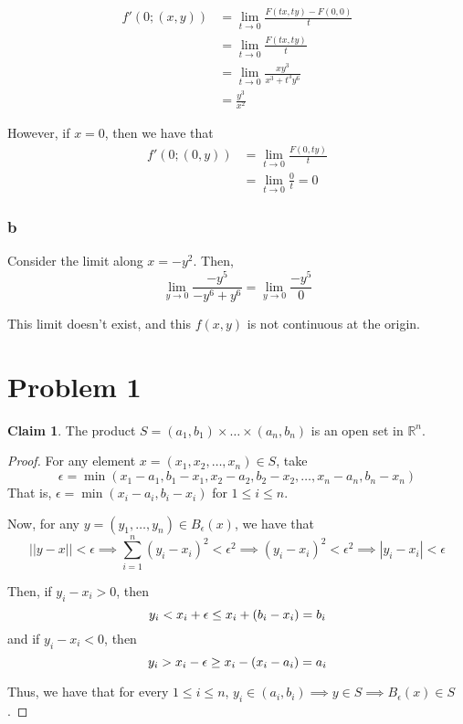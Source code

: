 \documentclass[12pt,letterpaper]{article}
\theoremstyle{definition}
\newtheorem*{claim}{Claim}
\newcommand{\R}{\mathbb{R}}
\begin{document}
\begin{align*}
  f'(0; (x, y)) &= \lim_{t \rightarrow 0}\frac{F(tx, ty) - F(0,0)}{t} \\
                &= \lim_{t \rightarrow 0}\frac{F(tx, ty)}{t} \\
                &= \lim_{t \rightarrow 0}\frac{xy^3}{x^3+t^3y^6} \\
                &= \frac{y^3}{x^2}
\end{align*}

However, if $x = 0$, then we have that
\begin{align*}
  f'(0; (0, y)) &= \lim_{t \rightarrow 0}\frac{F(0, ty)}{t} \\
                &= \lim_{t \rightarrow 0}\frac{0}{t} = 0
\end{align*}

\subsubsection*{b}

Consider the limit along $x = -y^2$. Then,
\[
  \lim_{y \rightarrow 0}\frac{-y^5}{-y^6+y^6} = \lim_{y \rightarrow 0}\frac{-y^5}{0} 
\]

This limit doesn't exist, and this $f(x,y)$ is not continuous at the origin.
  
\section*{Problem 1}

\begin{claim}
  The product $S = (a_1, b_1) \times \dots \times (a_n, b_n)$ is an open set in
  $\R^n$.
\end{claim}

\begin{proof}
  For any element $x = (x_1, x_2, \dots, x_n) \in S$, take
  \[
    \epsilon = \min(x_1 - a_1, b_1 - x_1, x_2 - a_2, b_2 - x_2, \dots, x_n -
    a_n, b_n - x_n)
  \]
  That is, $\epsilon = \min(x_i - a_i, b_i - x_i)$ for $1 \leq i \leq n$.

  Now, for any $y = (y_1, \dots, y_n) \in B_\epsilon(x)$, we have that
  \[
    ||y - x|| < \epsilon \implies \sum_{i=1}^n(y_i-x_i)^2 < \epsilon^2 \implies
    (y_i - x_i)^2 < \epsilon^2 \implies |y_i-x_i| < \epsilon 
  \]

  Then, if $y_i - x_i > 0$, then
  \[
    y_i < x_i + \epsilon \leq x_i + (b_i - x_i) = b_i \\
  \]
  and if $y_i - x_i< 0$, then
  \[
    y_i > x_i - \epsilon \geq x_i - (x_i - a_i) = a_i \\
  \]

  Thus, we have that for every $1 \leq i \leq n$, $y_i \in (a_i, b_i) \implies y
  \in S \implies B_\epsilon(x) \in S$.
\end{proof}
\end{document}
